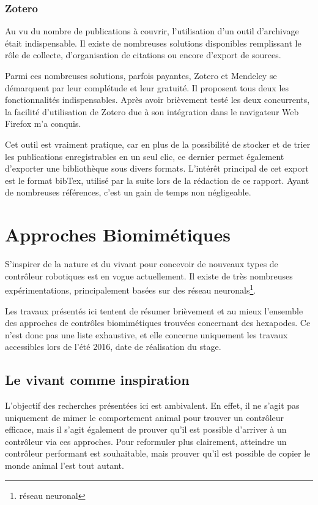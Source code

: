 \documentclass{tnreport}
\begin{document}
\subsubsection{Zotero} \label{lb:zotero}
Au vu du nombre de publications à couvrir, l'utilisation d'un outil d'archivage était indispensable. Il existe de nombreuses solutions disponibles remplissant le rôle de collecte, d'organisation de citations ou encore d'export de sources.

Parmi ces nombreuses solutions, parfois payantes, Zotero et Mendeley se démarquent par leur complétude et leur gratuité. Il proposent tous deux les fonctionnalités indispensables. Après avoir brièvement testé les deux concurrents, la facilité d'utilisation de Zotero due à son intégration dans le navigateur Web Firefox m'a conquis.

Cet outil est vraiment pratique, car en plus de la possibilité de stocker et de trier les publications enregistrables en un seul clic, ce dernier permet également d'exporter une bibliothèque sous divers formats. L'intérêt principal de cet export est le format bibTex, utilisé par la suite lors de la rédaction de ce rapport. Ayant de nombreuses références, c'est un gain de temps non négligeable.  

\newpage
\section{Approches Biomimétiques}\label{lb:biomimetic}
S'inspirer de la nature et du vivant pour concevoir de nouveaux types de contrôleur robotiques est en vogue actuellement. Il existe de très nombreuses expérimentations, principalement basées sur des \glspl{réseau neuronal}\footnote{\glsdesc{réseau neuronal}}.

Les travaux présentés ici tentent de résumer brièvement et au mieux l'ensemble des approches de contrôles biomimétiques trouvées concernant des hexapodes. Ce n'est donc pas une liste exhaustive, et elle concerne uniquement les travaux accessibles lors de l'été 2016, date de réalisation du stage. 
\subsection{Le vivant comme inspiration}
L'objectif des recherches présentées ici est ambivalent. En effet, il ne s'agit pas uniquement de mimer le comportement animal pour trouver un contrôleur efficace, mais il s'agit également de prouver qu'il est possible d'arriver à un contrôleur via ces approches. Pour reformuler plus clairement, atteindre un contrôleur performant est souhaitable, mais prouver qu'il est possible de copier le monde animal l'est tout autant.
\end{document}
